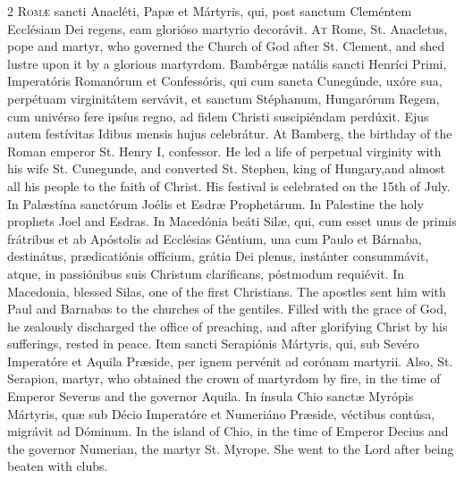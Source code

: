 \begin{paracol}{2}
\lettrine[lines=2]{R}{omæ} sancti Anacléti, 
 Papæ et Mártyris, qui, post sanctum Cleméntem Ecclésiam Dei regens, eam 
 glorióso martyrio decorávit.
\switchcolumn
{}
\lettrine[lines=2]{A}{t} Rome, St. Anacletus, pope and 
 martyr, who governed the Church of God after St. Clement, and shed lustre 
 upon it by a glorious martyrdom.
\switchcolumn*
{}
Bambérgæ natális sancti 
 Henríci Primi, Imperatóris Romanórum et Confessóris, qui cum sancta 
 Cunegúnde, uxóre sua, perpétuam virginitátem servávit, et sanctum Stéphanum, 
 Hungarórum Regem, cum univérso fere ipsíus regno, ad fidem Christi 
 suscipiéndam perdúxit. Ejus autem festívitas Idibus mensis hujus 
 celebrátur.
\switchcolumn
{}
At Bamberg, the birthday of the 
 Roman emperor St. Henry I, confessor. He led a life of perpetual 
 virginity with his wife St. Cunegunde, and converted St. Stephen, king of 
 Hungary,and almost all his people to the faith of Christ. His festival 
 is celebrated on the 15th of July.
\switchcolumn*
{}
In Palæstína sanctórum 
 Joélis et Esdræ Prophetárum.
\switchcolumn
{}
In Palestine the holy prophets Joel 
 and Esdras.
\switchcolumn*
{}
In Macedónia beáti Silæ, 
 qui, cum esset unus de primis frátribus et ab Apóstolis ad Ecclésias Géntium, 
 una cum Paulo et Bárnaba, destinátus, prædicatiónis offícium, grátia Dei 
 plenus, instánter consummávit, atque, in passiónibus suis Christum 
 claríficans, póstmodum requiévit.
\switchcolumn
{}
In Macedonia, blessed Silas, one of 
 the first Christians. The apostles sent him with Paul and Barnabas to 
 the churches of the gentiles. Filled with the grace of God, he 
 zealously discharged the office of preaching, and after glorifying Christ by 
 his sufferings, rested in peace.
\switchcolumn*
{}
Item sancti Serapiónis 
 Mártyris, qui, sub Sevéro Imperatóre et Aquila Præside, per ignem pervénit 
 ad corónam martyrii.
\switchcolumn
{}
Also, St. Serapion, martyr, who 
 obtained the crown of martyrdom by fire, in the time of Emperor Severus and 
 the governor Aquila.
\switchcolumn*
{}
In ínsula Chio sanctæ 
 Myrópis Mártyris, quæ sub Décio Imperatóre et Numeriáno Præside, véctibus 
 contúsa, migrávit ad Dóminum.
\switchcolumn
{}
In the island of Chio, in the time 
 of Emperor Decius and the governor Numerian, the martyr St. Myrope. 
 She went to the Lord after being beaten with clubs.

\end{paracol}
